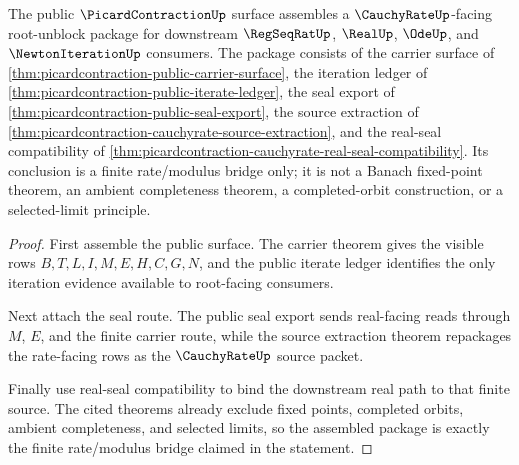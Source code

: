 \begin{theorem}
\label{thm:picardcontraction-cauchyrate-root-unblock-package}
The public $\PicardContractionUp$ surface assembles a $\CauchyRateUp$-facing root-unblock package for downstream $\RegSeqRatUp$, $\RealUp$, $\OdeUp$, and $\NewtonIterationUp$ consumers. The package consists of the carrier surface of \autoref{thm:picardcontraction-public-carrier-surface}, the iteration ledger of \autoref{thm:picardcontraction-public-iterate-ledger}, the seal export of \autoref{thm:picardcontraction-public-seal-export}, the source extraction of \autoref{thm:picardcontraction-cauchyrate-source-extraction}, and the real-seal compatibility of \autoref{thm:picardcontraction-cauchyrate-real-seal-compatibility}. Its conclusion is a finite rate/modulus bridge only; it is not a Banach fixed-point theorem, an ambient completeness theorem, a completed-orbit construction, or a selected-limit principle.
\end{theorem}
\begin{proof}
First assemble the public surface. The carrier theorem gives the visible rows $B,T,L,I,M,E,H,C,G,N$, and the public iterate ledger identifies the only iteration evidence available to root-facing consumers.

Next attach the seal route. The public seal export sends real-facing reads through $M$, $E$, and the finite carrier route, while the source extraction theorem repackages the rate-facing rows as the $\CauchyRateUp$ source packet.

Finally use real-seal compatibility to bind the downstream real path to that finite source. The cited theorems already exclude fixed points, completed orbits, ambient completeness, and selected limits, so the assembled package is exactly the finite rate/modulus bridge claimed in the statement.
\end{proof}


